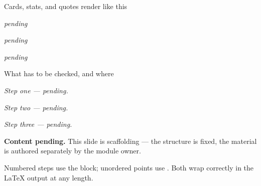 \documentclass[aspectratio=169,11pt,t]{beamer}
\begin{document}
\begin{frame}[shrink=25]{Cards, stats, and quotes render like this}
\begin{minipage}[t]{0.3253\textwidth}
\end{minipage}%
\hfill
\begin{minipage}[t]{0.3253\textwidth}
\end{minipage}%
\hfill
\begin{minipage}[t]{0.3253\textwidth}
\end{minipage}%
\begin{minipage}[t]{0.3253\textwidth}
\begin{icardaccent}
\textit{pending}
\end{icardaccent}
\end{minipage}%
\hfill
\begin{minipage}[t]{0.3253\textwidth}
\begin{icardaccent}
\textit{pending}
\end{icardaccent}
\end{minipage}%
\hfill
\begin{minipage}[t]{0.3253\textwidth}
\begin{icardaccent}
\textit{pending}
\end{icardaccent}
\end{minipage}%
\begin{iquote}
\end{iquote}
\end{frame}


\begin{frame}[shrink=25]{What has to be checked, and where}
\begin{isteps}
\item \textit{Step one --- pending.}
\item \textit{Step two --- pending.}
\item \textit{Step three --- pending.}
\end{isteps}
\begin{iband}[amber]
\textbf{Content pending.} This slide is scaffolding --- the structure is fixed, the material is authored separately by the module owner.
\end{iband}
{\fontsize{9.4}{12.6}\selectfont\color{fg2}Numbered steps use the  block; unordered points use . Both wrap correctly in the LaTeX output at any length.\par}\vskip 4pt
\end{frame}
\end{document}
